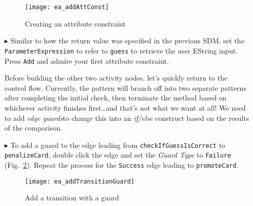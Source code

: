 \begin{itemize}
\vspace{0.5cm}

\begin{figure}[htbp]
\begin{center}
  \texttt{[image: ea\_addAttConst]}
  \caption{Creating an attribute constraint}
  \label{fig:sdmcheck_att_constraint}
\end{center}
\end{figure}

\item[$\blacktriangleright$] Similar to how the return value was specified in the previous SDM, set the \texttt{ParameterExpression} to refer to \texttt{guess}
to retrieve the user EString input. Press \texttt{Add} and admire your first attribute constraint.

\vspace{0.5cm}

Before building the other two activity nodes, let's quickly return to the control flow. Currently, the pattern will branch off into two separate patterns after
completing the initial check, then terminate the method based on whichever activity finishes first\ldots and that's not what we want at all! We need to add
\emph{edge guards}to change this into an \emph{if/else} construct based on the results of the comparison.

\newpage

\item[$\blacktriangleright$] To add a guard to the edge leading from \texttt{check\-If\-Guess\-Is\-Correct} to \texttt{penalize\-Card}, double click the edge
and set the \emph{Guard Type} to \texttt{Failure} (Fig.~\ref{fig:sdm_check_guard}). Repeat the process for the \texttt{Success} edge leading to
\texttt{promoteCard}.

\vspace{0.5cm}

\begin{figure}[htbp]
\begin{center}
  \texttt{[image: ea\_addTransitionGuard]}
  \caption{Add a transition with a guard}
  \label{fig:sdm_check_guard}
\end{center}
\end{figure}

\vspace{0.5cm}


\end{itemize}
